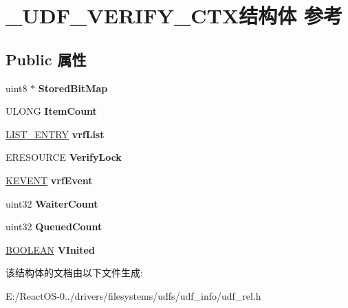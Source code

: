 \hypertarget{struct___u_d_f___v_e_r_i_f_y___c_t_x}{}\section{\+\_\+\+U\+D\+F\+\_\+\+V\+E\+R\+I\+F\+Y\+\_\+\+C\+T\+X结构体 参考}
\label{struct___u_d_f___v_e_r_i_f_y___c_t_x}
\subsection*{Public 属性}
\begin{DoxyCompactItemize}
\item 
\mbox{\label{struct___u_d_f___v_e_r_i_f_y___c_t_x_accf11796d8bafeff606a80b46dbd60e9}} 
uint8 $\ast$ {\bfseries Stored\+Bit\+Map}
\item 
\mbox{\label{struct___u_d_f___v_e_r_i_f_y___c_t_x_a724264002f0873e98f7d04c6b8e32394}} 
U\+L\+O\+NG {\bfseries Item\+Count}
\item 
\mbox{\label{struct___u_d_f___v_e_r_i_f_y___c_t_x_a4f6eaaaf98b4ea31135e9dfc468f3075}} 
\hyperlink{struct___l_i_s_t___e_n_t_r_y}{L\+I\+S\+T\+\_\+\+E\+N\+T\+RY} {\bfseries vrf\+List}
\item 
\mbox{\label{struct___u_d_f___v_e_r_i_f_y___c_t_x_a0bc8f14be992e639c314a05c1f9aae02}} 
E\+R\+E\+S\+O\+U\+R\+CE {\bfseries Verify\+Lock}
\item 
\mbox{\label{struct___u_d_f___v_e_r_i_f_y___c_t_x_ab29cb0777464565e7cc3643b2c8813ac}} 
\hyperlink{struct___k_e_v_e_n_t}{K\+E\+V\+E\+NT} {\bfseries vrf\+Event}
\item 
\mbox{\label{struct___u_d_f___v_e_r_i_f_y___c_t_x_ad705b149c307bef9812c2f22c0c31237}} 
uint32 {\bfseries Waiter\+Count}
\item 
\mbox{\label{struct___u_d_f___v_e_r_i_f_y___c_t_x_a3ff53c5e2d9f3aaf134e5159c58a784e}} 
uint32 {\bfseries Queued\+Count}
\item 
\mbox{\label{struct___u_d_f___v_e_r_i_f_y___c_t_x_a118f798a961105e463af3ced5acf5cf0}} 
\hyperlink{_processor_bind_8h_a112e3146cb38b6ee95e64d85842e380a}{B\+O\+O\+L\+E\+AN} {\bfseries V\+Inited}
\end{DoxyCompactItemize}


该结构体的文档由以下文件生成\+:\begin{DoxyCompactItemize}
\item 
E\+:/\+React\+O\+S-\/0../drivers/filesystems/udfs/udf\+\_\+info/udf\+\_\+rel.\+h\end{DoxyCompactItemize}
